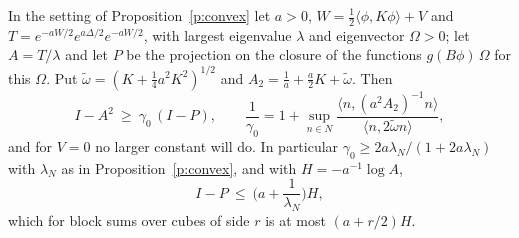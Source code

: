 \begin{proposition}\label{p:convexstep}
In the setting of Proposition~\ref{p:convex} let $a>0$, $W=\tfrac12\langle\phi,K\phi\rangle+V$ and
$T=e^{-aW/2}e^{a\Delta/2}e^{-aW/2}$, with largest eigenvalue $\lambda$ and eigenvector $\Omega>0$; let
$A=T/\lambda$ and let $P$ be the projection on the closure of the functions $g(B\phi)\,\Omega$ for this
$\Omega$. Put $\tilde\omega=(K+\tfrac14a^2K^2)^{1/2}$ and $A_2=\tfrac1a+\tfrac a2K+\tilde\omega$. Then
\[
I-A^2\ \ge\ \gamma_0\,(I-P),\qquad
\frac1{\gamma_0}=1+\sup_{n\in N}\frac{\langle n,(a^2A_2)^{-1}n\rangle}{\langle n,2\tilde\omega n\rangle},
\]
and for $V=0$ no larger constant will do. In particular $\gamma_0\ge2a\lambda_N/(1+2a\lambda_N)$ with
$\lambda_N$ as in Proposition~\ref{p:convex}, and with $H=-a^{-1}\log A$,
\[
I-P\ \le\ \Big(a+\frac1{\lambda_N}\Big)H ,
\]
which for block sums over cubes of side $r$ is at most $(a+r/2)H$.
\end{proposition}
